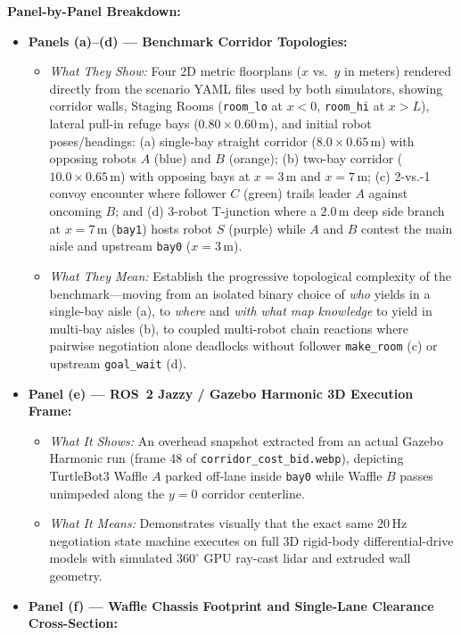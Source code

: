 \documentclass[10pt,a4paper]{article}
\begin{document}
\textbf{Panel-by-Panel Breakdown:}
\begin{itemize}
  \item \textbf{Panels (a)--(d) --- Benchmark Corridor Topologies:}
  \begin{itemize}
    \item \emph{What They Show:} Four 2D metric floorplans ($x$ vs.\ $y$ in meters) rendered directly from the scenario YAML files used by both simulators, showing corridor walls, Staging Rooms (\texttt{room\_lo} at $x<0$, \texttt{room\_hi} at $x>L$), lateral pull-in refuge bays ($0.80\times 0.60$\,m), and initial robot poses/headings: (a) single-bay straight corridor ($8.0\times 0.65$\,m) with opposing robots $A$ (blue) and $B$ (orange); (b) two-bay corridor ($10.0\times 0.65$\,m) with opposing bays at $x=3$\,m and $x=7$\,m; (c) 2-vs.-1 convoy encounter where follower $C$ (green) trails leader $A$ against oncoming $B$; and (d) 3-robot T-junction where a $2.0$\,m deep side branch at $x=7$\,m (\texttt{bay1}) hosts robot $S$ (purple) while $A$ and $B$ contest the main aisle and upstream \texttt{bay0} ($x=3$\,m).
    \item \emph{What They Mean:} Establish the progressive topological complexity of the benchmark---moving from an isolated binary choice of \emph{who} yields in a single-bay aisle (a), to \emph{where} and \emph{with what map knowledge} to yield in multi-bay aisles (b), to coupled multi-robot chain reactions where pairwise negotiation alone deadlocks without follower \texttt{make\_room} (c) or upstream \texttt{goal\_wait} (d).
  \end{itemize}
  \item \textbf{Panel (e) --- ROS~2 Jazzy / Gazebo Harmonic 3D Execution Frame:}
  \begin{itemize}
    \item \emph{What It Shows:} An overhead snapshot extracted from an actual Gazebo Harmonic run (frame 48 of \texttt{corridor\_\allowbreak cost\_bid.webp}), depicting TurtleBot3 Waffle $A$ parked off-lane inside \texttt{bay0} while Waffle $B$ passes unimpeded along the $y=0$ corridor centerline.
    \item \emph{What It Means:} Demonstrates visually that the exact same 20\,Hz negotiation state machine executes on full 3D rigid-body differential-drive models with simulated $360^\circ$ GPU ray-cast lidar and extruded wall geometry.
  \end{itemize}
  \item \textbf{Panel (f) --- Waffle Chassis Footprint and Single-Lane Clearance Cross-Section:}

\end{itemize}
\end{document}
